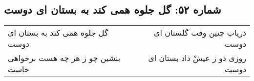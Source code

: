 \begin{center}
\section*{شماره ۵۲: گل جلوه همی کند به بستان ای دوست}
\label{sec:052}
\begin{longtable}{l p{0.5cm} r}
گل جلوه همی کند به بستان ای دوست
&&
دریاب چنین وقت گلستان ای دوست
\\
بنشین چو ز هر چه هست برخواهی خاست
&&
روزی دو ز عیشْ داد بستان ای دوست
\\
\end{longtable}
\end{center}
